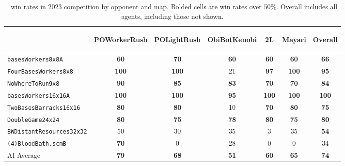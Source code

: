 \documentclass{article}
\begin{document}
\begin{table}[ht]
    \caption{\agentName\ win rates in 2023 competition by opponent and map. Bolded cells are win rates over 50\%. Overall includes all agents, including those not shown.}
    \label{tab:competition-winrate-by-map}
    \begin{center}
    \begin{tabular}{lccccc|c}
    & \begin{sideways}POWorkerRush\end{sideways} & \begin{sideways}POLightRush\end{sideways} & \begin{sideways}ObiBotKenobi\end{sideways} & \begin{sideways}2L\end{sideways} & \begin{sideways}Mayari\end{sideways} & \begin{sideways}Overall\end{sideways}\\ 
    \midrule
    \texttt{basesWorkers8x8A} & \textbf{60} & \textbf{70} & \textbf{60} & \textbf{60} & \textbf{60} & \textbf{66}\\ 
    \texttt{FourBasesWorkers8x8} & \textbf{100} & \textbf{100} & 21 & \textbf{97} & \textbf{100} & \textbf{95}\\ 
    \texttt{NoWhereToRun9x8} & \textbf{90} & \textbf{85} & \textbf{83} & \textbf{70} & \textbf{70} & \textbf{84}\\
    \texttt{basesWorkers16x16A} & \textbf{100} & \textbf{100} & \textbf{95} & \textbf{100} & \textbf{100} & \textbf{100}\\
    \texttt{TwoBasesBarracks16x16} & \textbf{80} & \textbf{80} & 10 & \textbf{70} & \textbf{80} & \textbf{75}\\
    \texttt{DoubleGame24x24} & \textbf{80} & \textbf{75} & \textbf{78} & \textbf{80} & \textbf{75} & \textbf{80}\\ 
    \texttt{BWDistantResources32x32} & 50 & 30 & 35 & 3 & 35 & \textbf{54}\\
    \texttt{(4)BloodBath.scmB} & \textbf{70} & 0 & 28 & 0 & 0 & 34\\ 
    \hline
    AI Average & \textbf{79} & \textbf{68} & \textbf{51} & \textbf{60} & \textbf{65} & \textbf{74}\\ 
    \end{tabular}
    \end{center}
\end{table}
\end{document}
